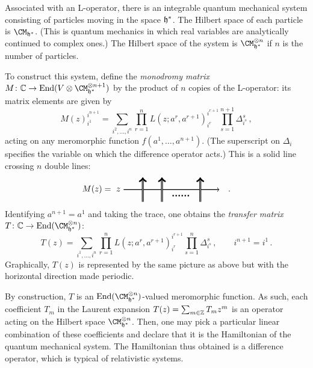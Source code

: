 Associated with an L-operator, there is an integrable quantum
mechanical system consisting of particles moving in the space $\mathfrak{h}^*$.
The Hilbert space of each particle is $\CM_{\hf^*}$.  (This is quantum
mechanics in which real variables are analytically continued to
complex ones.) The Hilbert space of the system is
$\CM_{\hf^*}^{\otimes n}$ if $n$ is the number of particles.

To construct this system, define the \emph{monodromy matrix}
$M\colon \C \to \End(V \otimes \CM_{\hf^*}^{\otimes n + 1})$ by the
product of $n$ copies of the L-operator: its matrix elements are given
by
\begin{equation}
  M(z)^{i^{n+1}}_{i^1}
  =
  \sum_{i^2, \dotsc, i^n}
  \prod_{r=1}^n
  L(z; a^r,a^{r+1})^{i^{r+1}}_{i^r}
  \prod_{s=1}^{n+1} \Delta_{i^s}^s \,,
\end{equation}
acting on any meromorphic function $f(a^1, \dotsc, a^{n+1})$.  (The
superscript on $\Delta_i$ specifies the variable on which the
difference operator acts.)  This is a solid line crossing $n$ double
lines:
\begin{equation}
  M(z)
  =
  \begin{tikzpicture}[xscale=0.8, yscale=0.5, baseline=(x.base)]
    \node (x) at (0,0) {\vphantom{x}};

    \draw[thick, ->] (0,0) node[left] {$z$} -- (5,0);
    \draw[thick, double, ->] (1,-1) -- +(90:2);
    \draw[thick, double, ->] (2,-1) -- +(90:2);
    
    \draw[ultra thick, dotted, -] (2.55,-0.5) -- (3.45,-0.5);

    \draw[thick, double, ->] (4,-1) -- +(90:2);
  \end{tikzpicture}
  \quad .
\end{equation}
Identifying $a^{n+1} = a^1$ and taking the trace, one
obtains the \emph{transfer matrix}
$T\colon \C \to \End(\CM_{\hf^*}^{\otimes n})$:
\begin{equation}
  T(z)
  =
  \sum_{i^1, \dotsc, i^n}
  \prod_{r=1}^n
  L(z; a^r,a^{r+1})^{i^{r+1}}_{i^r}
  \prod_{s=1}^n \Delta_{i^s}^s
  \,,
  \qquad
  i^{n+1} = i^1 \,.
\end{equation}
Graphically, $T(z)$ is represented by the same picture as above but
with the horizontal direction made periodic.

By construction, $T$ is an $\End(\CM_{\hf^*}^{\otimes n})$-valued
meromorphic function.  As such, each coefficient $T_m$ in the Laurent
expansion $T(z) = \sum_{m \in \mathbb{Z}} T_m z^m$ is an operator acting on
the Hilbert space $\CM_{\hf^*}^{\otimes n}$.  Then, one may pick a
particular linear combination of these coefficients and declare that
it is the Hamiltonian of the quantum mechanical system.  The
Hamiltonian thus obtained is a difference operator, which is typical
of relativistic systems.

